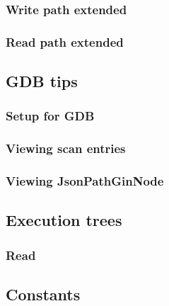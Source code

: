 \documentclass[11pt]{article}
\begin{document}
\hypertarget{write-path-extended}{%
\subsubsection{Write path extended}\label{write-path-extended}}


\hypertarget{read-path-extended}{%
\subsubsection{Read path extended}\label{read-path-extended}}


\hypertarget{gdb-tips}{%
\subsection{GDB tips}\label{gdb-tips}}


\hypertarget{setup-for-gdb}{%
\subsubsection{Setup for GDB}\label{setup-for-gdb}}


\hypertarget{viewing-scan-entries}{%
\subsubsection{Viewing scan entries}\label{viewing-scan-entries}}


\hypertarget{viewing-jsonpathginnode}{%
\subsubsection{Viewing JsonPathGinNode}\label{viewing-jsonpathginnode}}


\hypertarget{execution-trees}{%
\subsection{Execution trees}\label{execution-trees}}

\hypertarget{read}{%
\subsubsection{Read}\label{read}}


\hypertarget{constants}{%
\subsection{Constants}\label{constants}}

\end{document}
